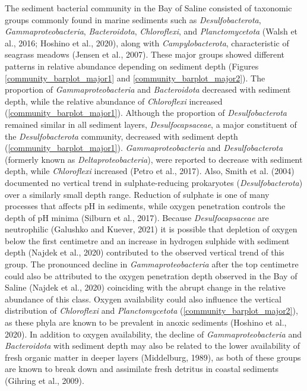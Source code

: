 \documentclass[12pt,]{article}
\begin{document}
The sediment bacterial community in the Bay of Saline consisted of
taxonomic groups commonly found in marine sediments such as
\emph{Desulfobacterota}, \emph{Gammaproteobacteria},
\emph{Bacteroidota}, \emph{Chloroflexi}, and \emph{Planctomycetota}
(Walsh et al., 2016; Hoshino et al., 2020), along with
\emph{Campylobacterota}, characteristic of seagrass meadows (Jensen et
al., 2007). These major groups showed different patterns in relative
abundance depending on sediment depth (Figures
\ref {community_barplot_major1} and \ref {community_barplot_major2}).
The proportion of \emph{Gammaproteobacteria} and \emph{Bacteroidota}
decreased with sediment depth, while the relative abundance of
\emph{Chloroflexi} increased (\autoref {community_barplot_major1}).
Although the proportion of \emph{Desulfobacterota} remained similar in
all sediment layers, \emph{Desulfocapsaceae}, a major constituent of the
\emph{Desulfobacterota} community, decreased with sediment depth
(\autoref {community_barplot_major1}). \emph{Gammaproteobacteria} and
\emph{Desulfobacterota} (formerly known as \emph{Deltaproteobacteria}),
were reported to decrease with sediment depth, while \emph{Chloroflexi}
increased (Petro et al., 2017). Also, Smith et al. (2004) documented no
vertical trend in sulphate-reducing prokaryotes
(\emph{Desulfobacterota}) over a similarly small depth range. Reduction
of sulphate is one of many processes that affects pH in sediments, while
oxygen penetration controls the depth of pH minima (Silburn et al.,
2017). Because \emph{Desulfocapsaceae} are neutrophilic (Galushko and
Kuever, 2021) it is possible that depletion of oxygen below the first
centimetre and an increase in hydrogen sulphide with sediment depth
(Najdek et al., 2020) contributed to the observed vertical trend of this
group. The pronounced decline in \emph{Gammaproteobacteria} after the
top centimetre could also be attributed to the oxygen penetration depth
observed in the Bay of Saline (Najdek et al., 2020) coinciding with the
abrupt change in the relative abundance of this class. Oxygen
availability could also influence the vertical distribution of
\emph{Chloroflexi} and \emph{Planctomycetota}
(\autoref {community_barplot_major2}), as these phyla are known to be
prevalent in anoxic sediments (Hoshino et al., 2020). In addition to
oxygen availability, the decline of \emph{Gammaproteobacteria} and
\emph{Bacteroidota} with sediment depth may also be related to the lower
availability of fresh organic matter in deeper layers (Middelburg,
1989), as both of these groups are known to break down and assimilate
fresh detritus in coastal sediments (Gihring et al., 2009).
\end{document}
